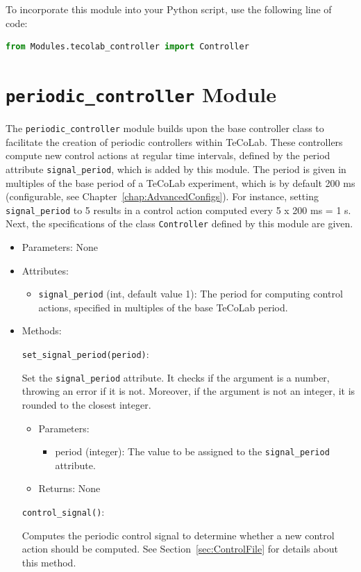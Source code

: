 \documentclass[12pt]{report}
\begin{document}
To incorporate this module into your Python script, use the following line of code:

\begin{lstlisting}[language = Python]
from Modules.tecolab_controller import Controller
\end{lstlisting}

\section{\texttt{periodic\_controller} Module}

The \texttt{periodic\_controller} module builds upon the base controller class to facilitate the creation of periodic controllers within TeCoLab. These controllers compute new control actions at regular time intervals, defined by the period attribute \texttt{signal\_period}, which is added by this module. The period is given in multiples of the base period of a TeCoLab experiment, which is by default 200 ms (configurable, see Chapter~\ref{chap:AdvancedConfigs}). For instance, setting \texttt{signal\_period} to 5 results in a control action computed every 5 x 200 ms = 1 s. Next, the specifications of the class \texttt{Controller} defined by this module are given.

\begin{itemize}

\item Parameters: None

\item Attributes:

\begin{itemize}
\item \texttt{signal\_period} (int, default value 1): The period for computing control actions, specified in multiples of the base TeCoLab period.
\end{itemize}

\item Methods:

\texttt{set\_signal\_period(period)}:

Set the \texttt{signal\_period} attribute. It checks if the argument is a number, throwing an error if it is not. Moreover, if the argument is not an integer, it is rounded to the closest integer.

\begin{itemize}
\item Parameters:

\begin{itemize}
\item period (integer): The value to be assigned to the \texttt{signal\_period} attribute.
\end{itemize}

\item Returns: None

\end{itemize}

\texttt{control\_signal()}:

Computes the periodic control signal to determine whether a new control action should be computed. See Section~\ref{sec:ControlFile} for details about this method.

\end{itemize}
\end{document}
